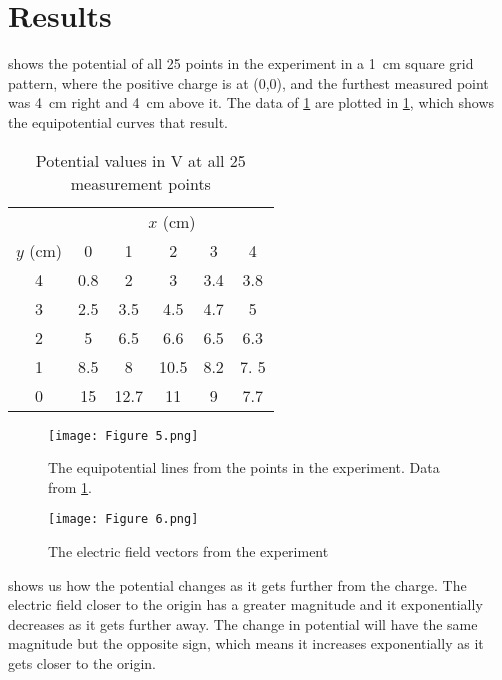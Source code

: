 \documentclass[10pt,journal,twoside]{IEEEtran}
\begin{document}
\section{Results}
 shows the potential of all 25 points in the experiment in a \qty{1}{\centi\meter} square grid pattern, where the positive charge is at (0,0), and the furthest measured point was \qty{4}{\centi\meter} right and \qty{4}{\centi\meter} above it. The data of \cref{tab:1} are plotted in \cref{fig:5}, which shows the equipotential curves that result. 
\begin{table}
\caption{Potential values in \unit{\volt} at all 25 measurement points}
\label{tab:1}
\begin{center}
\begin{tabular}{cccccc}
\toprule
& \multicolumn{5}{c}{$x$ (\unit{\centi\meter})} \\
$y$ (\unit{\centi\meter}) & 0 & 1 & 2 & 3 & 4 \\
\midrule 
4 & 0.8 & 2 & 3 & 3.4 & 3.8 \\
3 & 2.5 & 3.5 & 4.5 & 4.7 & 5 \\
2 & 5 & 6.5 & 6.6 & 6.5 & 6.3 \\
1 & 8.5 & 8 & 10.5 & 8.2 & 7. 5 \\
0 & 15 & 12.7 & 11 & 9 & 7.7 \\ 
\bottomrule
\end{tabular}
\end{center}
\end{table}

\begin{figure}
\begin{center}
\texttt{[image: Figure 5.png]}
\end{center}
\caption{The equipotential lines from the points in the experiment. Data from \cref{tab:1}.}
\label{fig:5}
\end{figure}

\begin{figure}
\begin{center}
\texttt{[image: Figure 6.png]}
\end{center}    
\caption{The electric field vectors from the experiment}
\label{fig:6}
\end{figure}
 shows us how the potential changes as it gets further from the charge. The electric field closer to the origin has a greater magnitude and it exponentially decreases as it gets further away. The change in potential will have the same magnitude but the opposite sign, which means it increases exponentially as it gets closer to the origin.
\end{document}

